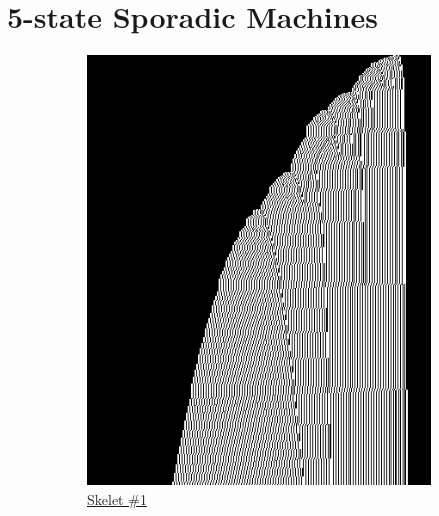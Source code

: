 \section{5-state Sporadic Machines}\label{sec:sporadic}



\begin{figure}[h!]
    \centering

    \begin{minipage}{\textwidth}
        \centering
        \begin{subfigure}{0.3\textwidth}
            \centering
            \includegraphics[width=\linewidth]{figures/sporadic-machines/sk1.png}
            \caption*{\href{https://bbchallenge.org/1RB1RD_1LC0RC_1RA1LD_0RE0LB_---1RC}{Skelet \#1}}
        \end{subfigure}
        \hfill
        \begin{subfigure}{0.3\textwidth}
            \centering

\end{subfigure}
\end{minipage}
\end{figure}
